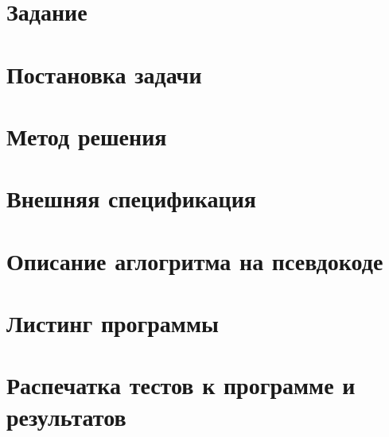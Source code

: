 \documentclass[12pt]{extarticle}
\begin{document}

\pagebreak

\section*{\hfil Задание \hfil}

\pagebreak

\section*{\hfil Постановка задачи \hfil}

\pagebreak

\section*{\hfil Метод решения \hfil}

\pagebreak

\section*{\hfil Внешняя спецификация \hfil}

\pagebreak

\section*{\hfil Описание аглогритма на псевдокоде \hfil}

\pagebreak

\section*{\hfil Листинг программы \hfil}

\pagebreak

\section*{\hfil Распечатка тестов к программе и результатов \hfil}

\pagebreak
\end{document}
